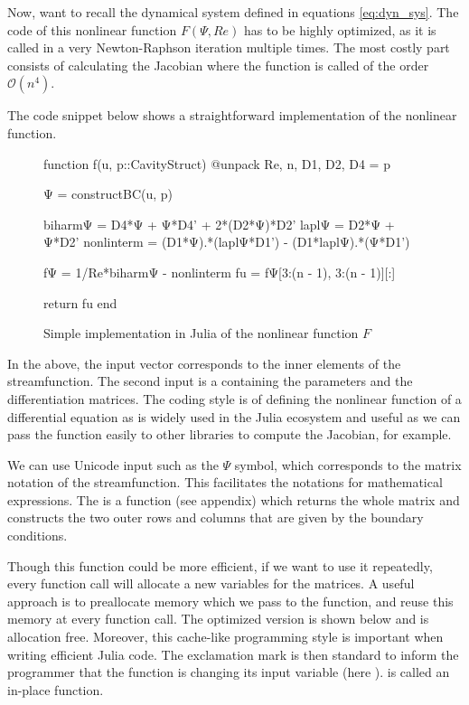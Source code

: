 Now, want to recall the dynamical system defined in equations \eqref{eq:dyn_sys}.
The code of this nonlinear function $F(\Psi, Re)$ has to be highly optimized,
as it is called in a very Newton-Raphson iteration multiple times. The most
costly part consists of calculating the Jacobian where the function is called
of the order $\mathcal{O}(n^4)$.

The code snippet below shows a straightforward implementation of the
nonlinear function. 


\begin{figure}[h]
\begin{jllisting}
function f(u, p::CavityStruct)
    @unpack Re, n, D1, D2, D4 = p

    Ψ = constructBC(u, p)

    biharmΨ = D4*Ψ +  Ψ*D4' + 2*(D2*Ψ)*D2'
    laplΨ = D2*Ψ + Ψ*D2'
    nonlinterm = (D1*Ψ).*(laplΨ*D1') - (D1*laplΨ).*(Ψ*D1')
    
    fΨ = 1/Re*biharmΨ - nonlinterm
    fu = fΨ[3:(n - 1), 3:(n - 1)][:]

    return fu 
end
\end{jllisting}
\caption{Simple implementation in Julia of the nonlinear function $F$}
\end{figure}

In the above, the input vector  corresponds to the inner elements of
the streamfunction. The second input  is a 
containing the parameters and the differentiation matrices. The coding style is
of defining the nonlinear function of a differential equation as 
is widely used in the Julia ecosystem and useful as we can pass the function
easily to other libraries to compute the Jacobian, for example.

We can use Unicode input such as the $\Psi $ symbol, which corresponds to the
matrix notation of the streamfunction. This facilitates the notations for
mathematical expressions. The  is a function (see
appendix) which returns the whole matrix and constructs the two outer rows and
columns that are given by the boundary conditions.

Though this function could be more efficient, if we want to use it repeatedly,
every function call will allocate a new variables for the matrices. A useful
approach is to preallocate memory which we pass to the function, and reuse this
memory at every function call. The optimized version is shown below and is
allocation free. Moreover, this cache-like programming style is important when
writing efficient Julia code. The exclamation mark is then standard to inform
the programmer that the function is changing its input variable (here
).  is called an in-place function.

